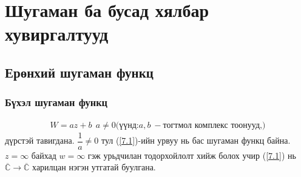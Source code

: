 \chapter{Шугаман ба бусад хялбар хувиргалтууд}
\section{Ерөнхий шугаман функц}
 \subsection{Бүхэл шугаман функц}
 
\begin{eqnarray} \label{7.1}
W=az+b \ \ a\neq 0 (\text{үүнд:} a,b \ - \text{тогтмол комплекс тоонууд,)}
\end{eqnarray}
дүрстэй тавигдана. $\dfrac{1}{a}\neq 0$ тул (\ref{7.1})-ийн урвуу нь бас шугаман функц байна. $z=\infty$ байхад $w=\infty$ гэж урьдчилан тодорхойлолт хийж болох учир (\ref{7.1}) нь $\overline{\mathbb{C}}\rightarrow \overline{\mathbb{C}}$ харилцан нэгэн утгатай буулгана.

